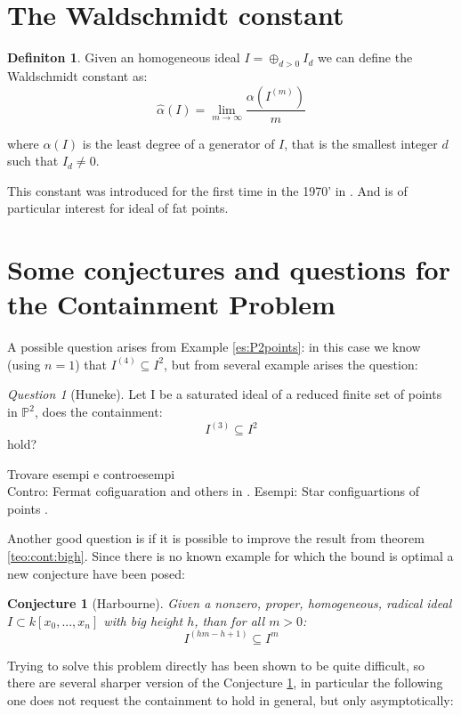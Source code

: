 \documentclass[]{book}
\theoremstyle{plain}
\newtheorem{conj}[teo]{Conjecture}
\theoremstyle{remark}
\newtheorem{que}[rem]{Question}
\theoremstyle{definition}
\newtheorem{deff}[teo]{Definiton}
\newcommand{\PP}{\mathbb{P}}
\newcommand{\cont}[2]{ I^{(#1)} \subseteq I^{#2}}
\begin{document}
	
\section{The Waldschmidt constant}

\begin{deff}\label{def:walds}
Given an homogeneous ideal $ I = \oplus_{d>0} I_d$ we can define the Waldschmidt constant as:
\[
\hat{\alpha}(I) = \lim_{m \to \infty} \frac{\alpha (I^{(m)})   }{m}
\]

where $ \alpha(I) $ is the least degree of a generator of $ I $, that is the smallest integer $ d $ such that $ I_d \neq 0 $.
\end{deff}

This constant was introduced for the first time in the 1970' in \cite{Wald77}. And is of particular interest for ideal of fat points. 

\section{Some conjectures and questions for the Containment Problem}
	A possible question arises from Example \ref{es:P2points}: in this case we know (using $ n=1 $) that $  \cont{4}{2}$, but from several example arises the question:
	\begin{que}[Huneke] \label{que:32}
	Let I be a saturated ideal of a reduced finite set of points in $ \PP^2 $, does the containment:
	\[ \cont{3}{2} \]
	hold?
	\end{que}
	
	\begin{tboxprop}
	Trovare esempi e controesempi\\
	Contro: Fermat cofiguaration and others in \cite{DSTG13}. 
	Esempi: Star configuartions of points \cite{Har11}.
	\end{tboxprop}
	
	Another good question is if it is possible to improve the result from theorem \ref{teo:cont:bigh}. Since there is no known example for which the bound is optimal a new conjecture have been posed:
	
	\begin{conj}[Harbourne]\label{conj:harb}
		Given a nonzero, proper, homogeneous, radical ideal $ I \subset k[x_0 , ... , x_n] $ with big height $ h $, than for all $ m > 0 $:
		\[
		\cont{hm - h +1}{m}
		\]
	\end{conj}
	
	Trying to solve this problem directly has been shown to be quite difficult, so there are several  sharper version of the Conjecture \ref{conj:harb}, in particular the following one does not request the containment to hold in general, but only asymptotically:
	
\end{document}
